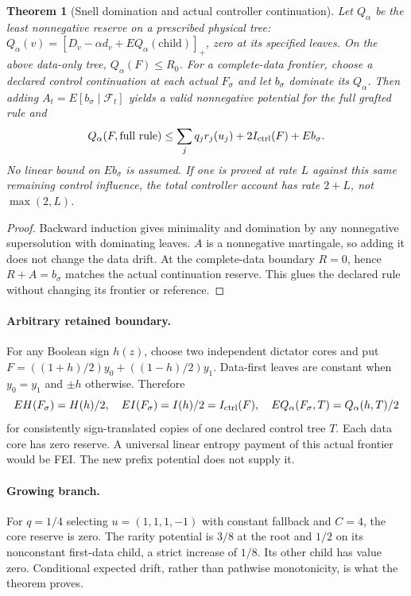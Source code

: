 \documentclass{article}
\newtheorem{theorem}{Theorem}
\begin{document}
\begin{theorem}[Snell domination and actual controller continuation]
Let $Q_\alpha$ be the least nonnegative reserve on a prescribed physical tree:
$Q_\alpha(v)=[D_v-\alpha d_v+E Q_\alpha(\text{child})]_+$, zero at its
specified leaves. On the above data-only tree, $Q_\alpha(F)\le R_0$.
For a complete-data frontier, choose a declared control continuation at each
actual $F_\sigma$ and let $b_\sigma$ dominate its $Q_\alpha$.
Then adding $A_t=E[b_\sigma\mid\mathcal F_t]$ yields a valid nonnegative
potential for the full grafted rule and
\[
Q_\alpha(F,\text{full rule})\le
\sum_jq_jr_j(u_j)+2I_{\rm ctrl}(F)+E b_\sigma.
\]
No linear bound on $E b_\sigma$ is assumed. If one is proved at rate $L$
against this same remaining control influence, the total controller account
has rate $2+L$, not $\max(2,L)$.
\end{theorem}
\begin{proof}
Backward induction gives minimality and domination by any nonnegative
supersolution with dominating leaves. $A$ is a nonnegative martingale,
so adding it does not change the data drift. At the complete-data boundary
$R=0$, hence $R+A=b_\sigma$ matches the actual continuation reserve.
This glues the declared rule without changing its frontier or reference.
\end{proof}

\paragraph{Arbitrary retained boundary.}
For any Boolean sign $h(z)$, choose two independent dictator cores and put
$F=((1+h)/2)y_0+((1-h)/2)y_1$. Data-first leaves are constant when
$y_0=y_1$ and $\pm h$ otherwise. Therefore
\[
E H(F_\sigma)=H(h)/2,\quad E I(F_\sigma)=I(h)/2=I_{\rm ctrl}(F),
\quad E Q_\alpha(F_\sigma,T)=Q_\alpha(h,T)/2
\]
for consistently sign-translated copies of one declared control tree $T$.
Each data core has zero reserve. A universal linear entropy payment of this
actual frontier would be FEI. The new prefix potential does not supply it.

\paragraph{Growing branch.}
For $q=1/4$ selecting $u=(1,1,1,-1)$ with constant fallback and $C=4$,
the core reserve is zero. The rarity potential is $3/8$ at the root and
$1/2$ on its nonconstant first-data child, a strict increase of $1/8$.
Its other child has value zero. Conditional expected drift, rather than
pathwise monotonicity, is what the theorem proves.
\end{document}
